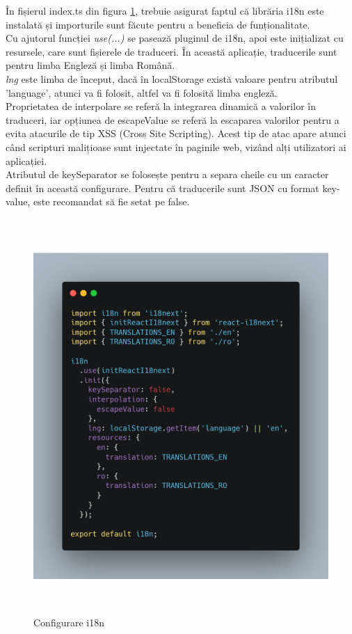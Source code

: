 În fișierul index.ts din figura \ref{fig:i18nInstance}, trebuie asigurat faptul că librăria i18n este instalată și importurile sunt făcute pentru a beneficia de funționalitate.\\
Cu ajutorul funcției {\it use(...)} se pasează pluginul de i18n, apoi este inițializat cu resursele, care sunt fișierele de traduceri. În această aplicație, traducerile sunt pentru limba Engleză și limba Română.\\

{\it lng} este limba de început, dacă în localStorage există valoare pentru atributul 'language', atunci va fi folosit, altfel va fi folosită limba engleză. \\

Proprietatea de interpolare se referă la integrarea dinamică a valorilor în traduceri, iar opțiunea de escapeValue se referă la escaparea valorilor pentru a evita atacurile de tip XSS (Cross Site Scripting).
Acest tip de atac apare atunci când scripturi malițioase sunt injectate în paginile web, vizând alți utilizatori ai aplicației.\\

Atributul de keySeparator se folosește pentru a separa cheile cu un caracter definit în această configurare. Pentru că traducerile sunt JSON cu format key-value, este recomandat să fie setat pe false.

\begin{figure}[h]
	\centering
	\includegraphics[width=150mm, height=150mm]{figs/i18nInstance.png}
	\caption{Configurare i18n}
	\label{fig:i18nInstance}
\end{figure}

